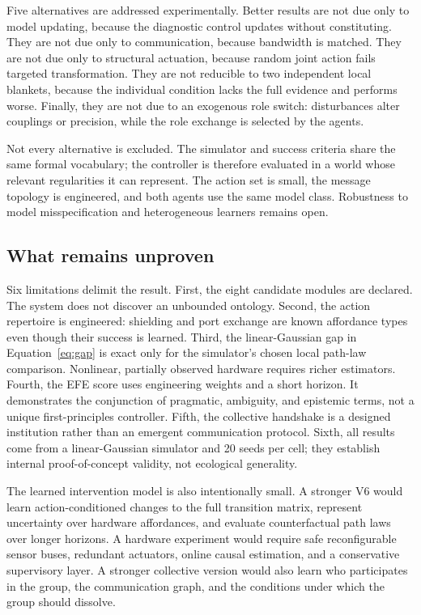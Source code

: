 \documentclass[11pt,a4paper]{article}
\numberwithin{equation}{section}
\begin{document}
Five alternatives are addressed experimentally. Better results are not due
only to model updating, because the diagnostic control updates without
constituting. They are not due only to communication, because bandwidth is
matched. They are not due only to structural actuation, because random joint
action fails targeted transformation. They are not reducible to two
independent local blankets, because the individual condition lacks the full
evidence and performs worse. Finally, they are not due to an exogenous role
switch: disturbances alter couplings or precision, while the role exchange
is selected by the agents.

Not every alternative is excluded. The simulator and success criteria share
the same formal vocabulary; the controller is therefore evaluated in a world
whose relevant regularities it can represent. The action set is small, the
message topology is engineered, and both agents use the same model class.
Robustness to model misspecification and heterogeneous learners remains open.

\subsection{What remains unproven}

Six limitations delimit the result. First, the eight candidate modules are
declared. The system does not discover an unbounded ontology. Second, the
action repertoire is engineered: shielding and port exchange are known
affordance types even though their success is learned. Third, the
linear-Gaussian gap in Equation~\eqref{eq:gap} is exact only for the simulator's
chosen local path-law comparison. Nonlinear, partially observed hardware
requires richer estimators. Fourth, the EFE score uses engineering weights
and a short horizon. It demonstrates the conjunction of pragmatic,
ambiguity, and epistemic terms, not a unique first-principles controller.
Fifth, the collective handshake is a designed institution rather than an
emergent communication protocol. Sixth, all results come from a
linear-Gaussian simulator and 20 seeds per cell; they establish internal
proof-of-concept validity, not ecological generality.

The learned intervention model is also intentionally small. A stronger V6
would learn action-conditioned changes to the full transition matrix,
represent uncertainty over hardware affordances, and evaluate counterfactual
path laws over longer horizons. A hardware experiment would require safe
reconfigurable sensor buses, redundant actuators, online causal estimation,
and a conservative supervisory layer.
 A stronger collective version would also learn who participates in the
group, the communication graph, and the conditions under which the group
should dissolve.
\end{document}
